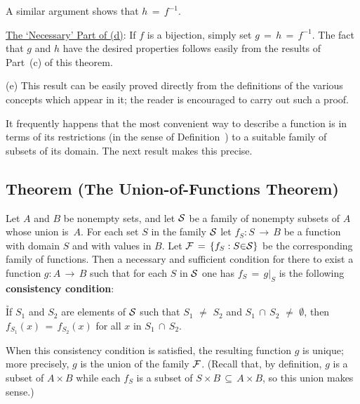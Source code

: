         A similar argument shows that $h \,=\, f^{-1}$.


        \underline{The `Necessary' Part of (d)}: If $f$ is a bijection, simply set $g \,=\, h \,=\, f^{-1}$.
    The fact that $g$ and $h$ have the desired properties follows easily from the results of Part~(c) of this theorem.

\V

        (e) This result can be easily proved directly from the definitions of the various concepts which appear in it;
    the reader is encouraged to carry out such a proof.

\VV

        It frequently happens that the most convenient way to describe a function is in terms of its restrictions
    (in the sense of Definition~) to a suitable family of subsets of its domain.
    The next result makes this precise.

\V

        \subsection{\small{{\bf Theorem} (The Union-of-Functions Theorem)}}
        \label{ThmA30.27}

        Let $A$ and $B$ be nonempty sets, and let ${\cal S}$ be a family of nonempty subsets of $A$ whose union is~$A$.
    For each set $S$ in the family ${\cal S}$ let $f_{S}:S \,{\rightarrow}\, B$ be a function with domain $S$ and with values in $B$.
    Let ${\cal F} \,=\, \{f_{S}: S{\in}{\cal S}\}$ be the corresponding family of functions.
    Then a necessary and sufficient condition for there to exist a function $g:A \,{\rightarrow}\, B$
    such that for each $S$ in ${\cal S}$ one has $f_{S} \,=\, g|_{S}$ is the following {\bf consistency condition}:

\VA
        \h If $S_{1}$ and $S_{2}$ are elements of ${\cal S}$ such that $S_{1} \,\,{\neq}\,\, S_{2}$ and $S_{1}\,{\cap}\,S_{2} \,\,{\neq}\,\, {\emptyset}$,
    then $f_{S_{1}}(x) \,=\, f_{S_{2}}(x)$ for all $x$ in $S_{1}\,{\cap}\,S_{2}$.

\VA

\noindent When this consistency condition is satisfied, the resulting function $g$ is unique;
    more precisely, $g$ is the union of the family ${\cal F}$.
    (Recall that, by definition, $g$ is a subset of $A{\times}B$ while each $f_{S}$ is a subset of $S{\times}B \,{\subseteq}\, A{\times}B$, so this union makes sense.)

